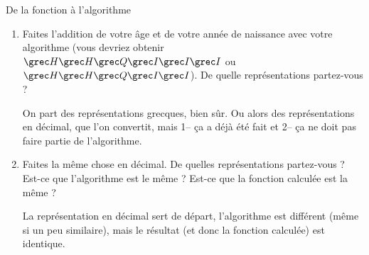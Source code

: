\begin{exercice}
\begin{exercicelet}{De la fonction à l'algorithme}
\begin{enumerate}
\begin{xcorrection}
        C'est un exemple, il y en a plusieurs possibles.\end{xcorrection}
    \item Faites l'addition de votre âge et de votre année de naissance
      avec votre algorithme (vous devriez obtenir
      $\Eta\Eta\Chi\Iota\Iota\Iota$ ou $\Eta\Eta\Chi\Iota\Iota$). De
      quelle représentations partez-vous ?
      \begin{correction}On part des représentations grecques, bien
        sûr. Ou alors des représentations en décimal, que l'on
        convertit, mais 1-- ça a déjà été fait et 2-- ça ne doit pas
        faire partie de l'algorithme.\end{correction}
    \item Faites la même chose en décimal. De quelles représentations
      partez-vous ? Est-ce que l'algorithme est le même ? Est-ce que
      la fonction calculée est la même ?
      \begin{xcorrection} La représentation en décimal sert de départ,
        l'algorithme est différent (même si un peu similaire), mais le résultat
        (et donc la fonction calculée) est identique.
      \end{xcorrection}
    \end{enumerate}
  \end{exercicelet}
\end{exercice}
